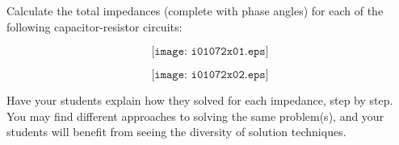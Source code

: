 

Calculate the total impedances (complete with phase angles) for each of the following capacitor-resistor circuits:

$$\texttt{[image: i01072x01.eps]}$$







$$\texttt{[image: i01072x02.eps]}$$







Have your students explain how they solved for each impedance, step by step.  You may find different approaches to solving the same problem(s), and your students will benefit from seeing the diversity of solution techniques.




